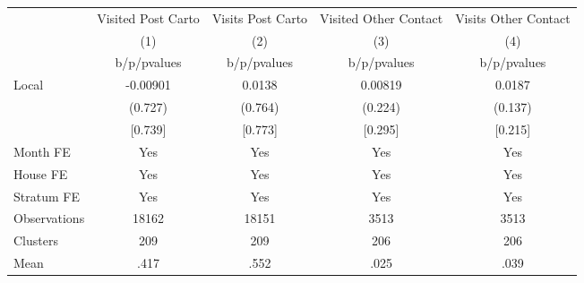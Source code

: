 {
\def\sym#1{\ifmmode^{#1}\else\(^{#1}\)\fi}
\begin{tabular}{l*{4}{c}}
\toprule
                &\multicolumn{1}{c}{Visited Post Carto}&\multicolumn{1}{c}{Visits Post Carto}&\multicolumn{1}{c}{Visited Other Contact}&\multicolumn{1}{c}{Visits Other Contact}\\
                &\multicolumn{1}{c}{(1)}&\multicolumn{1}{c}{(2)}&\multicolumn{1}{c}{(3)}&\multicolumn{1}{c}{(4)}\\
                &b/p/pvalues&b/p/pvalues&b/p/pvalues&b/p/pvalues\\
\midrule
Local           & -0.00901&   0.0138&  0.00819&   0.0187\\
                &  (0.727)&  (0.764)&  (0.224)&  (0.137)\\
                &  [0.739]&  [0.773]&  [0.295]&  [0.215]\\
Month FE        &      Yes&      Yes&      Yes&      Yes\\
House FE        &      Yes&      Yes&      Yes&      Yes\\
Stratum FE      &      Yes&      Yes&      Yes&      Yes\\
\midrule
Observations    &    18162&    18151&     3513&     3513\\
Clusters        &      209&      209&      206&      206\\
Mean            &     .417&     .552&     .025&     .039\\
\bottomrule
\end{tabular}
}
